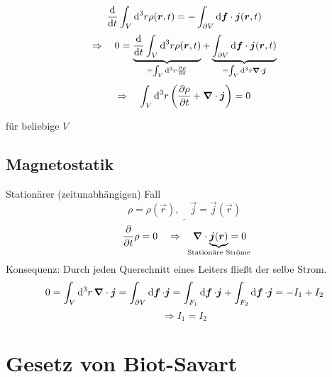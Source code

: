 \begin{minipage}{.65\linewidth}
	\begin{equation*}
	\frac{\textrm{d} }{\textrm{d} t} \int_V \textrm{d}^3 r \rho(\bm{r},t) = - \int_{\partial V} \textrm{d} \bm{f} \cdot \bm{j}(\bm{r},t)
	\end{equation*}
	\begin{equation*}
	\Rightarrow \quad 0 = \underbrace{\frac{\textrm{d} }{\textrm{d} t} \int_V \textrm{d} ^3 r \rho(\bm{r},t)}_{=\int_V \textrm{d}^3 r \frac{\partial \rho}{\partial t}} + \underbrace{\int_{\partial V} \textrm{d} \bm{f} \cdot \bm{j}(\bm{r},t)}_{=\int_V \textrm{d}^3 r \bm{\nabla} \cdot \bm{j}}
	\end{equation*}
	\begin{equation*}
	\Rightarrow \quad \int_V \textrm{d}^3 r \left(\frac{\partial \rho}{\partial t} + \bm{\nabla} \cdot \bm{j}\right) = 0
	\end{equation*}
\end{minipage}%

\noindent
für beliebige $ V $

\subsection{Magnetostatik}

Stationärer (zeitunabhängigen) Fall
$$\underline{\rho = \rho(\vec{r}), \quad \vec{j} = \vec{j}(\vec{r})}$$
$$\prt{}{t}\rho = 0 \quad \Rightarrow \quad \vabla \cdot \underbrace{\vec{j}(\vec{r})}_{\mathclap{\textrm{Stationäre Ströme}}} = 0$$
Konsequenz: Durch jeden Querschnitt eines Leiters fließt der selbe Strom.
$$0 = \int_V \mathrm{d}^3 r\mathop{}\! \bm{\nabla}\cdot\bm{j} = \int_{\partial V} \mathrm{d}\bm{f}\mathop{}\! \cdot \bm{j} = \int_{F_1} \mathrm{d}\bm{f}\mathop{}\! \cdot \bm{j} + \int_{F_2}\mathrm{d}\bm{f}\mathop{}\! \cdot \bm{j} = -I_1 + I_2$$
$$\Rightarrow I_1 = I_2$$


\section{Gesetz von Biot-Savart}

